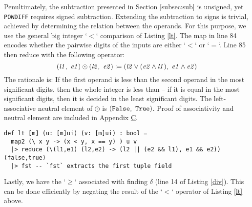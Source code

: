 Penultimately, the subtraction presented in Section \ref{subsec:sub} is
unsigned, yet \texttt{POWDIFF} requires signed subtraction. Extending the
subtraction to signs is trivial, achieved by determining the relation between
the operands. For this purpose, we use the general big integer `$<$` comparison
of Listing \ref{lt}. The map in line 84 encodes whether the pairwise digits of
the inputs are either `$<$` or `$=$`. Line 85 then reduce with the following
operator:
\begin{equation}
  \label{eq:lt}
  (\mathit{l1},~\mathit{e1}) \odot (\mathit{l2},~\mathit{e2}) \coloneq (\mathit{l2} \lor (\mathit{e2} \land \mathit{l1}),~\mathit{e1} \land \mathit{e2})
\end{equation}
The rationale is: If the first operand is less than the second operand in the
most significant digits, then the whole integer is less than -- if it is equal in
the most significant digits, then it is decided in the least significant
digits. The left-associative neutral element of $\odot$ is
$(\mathtt{False},~\mathtt{True})$. Proof of associativity and neutral
element are included in Appendix \hyperref[app:C]{C}.

\begin{lstlisting}[language=futhark,caption={\footnotesize Futhark function to check $u < v$ in parallel for big integers $u$ and $v$ from file \texttt{helper.fut}.},label={lt},firstnumber=83]
def lt [m] (u: [m]ui) (v: [m]ui) : bool =
  map2 (\ x y -> (x < y, x == y) ) u v
  |> reduce (\(l1,e1) (l2,e2) -> (l2 || (e2 && l1), e1 && e2)) (false,true)
  |> fst -- `fst` extracts the first tuple field
\end{lstlisting}

Lastly, we have the `$\geq$` associated with finding $\delta$ (line 14 of Listing
\ref{div}). This can be done efficiently by negating the result of the `$<$`
operator of Listing \ref{lt} above.

